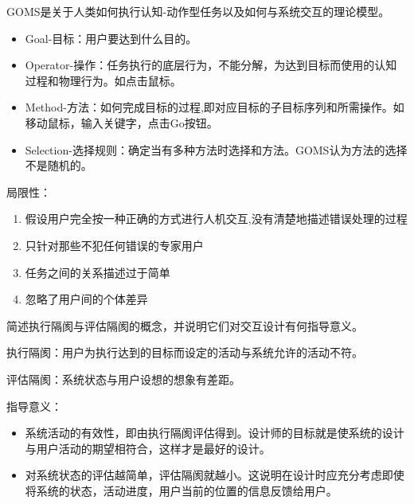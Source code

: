 \begin{solution}
GOMS是关于人类如何执行认知-动作型任务以及如何与系统交互的理论模型。
\begin{itemize}
    \item Goal-目标：用户要达到什么目的。
    \item Operator-操作：任务执行的底层行为，不能分解，为达到目标而使用的认知过程和物理行为。如点击鼠标。
    \item Method-方法：如何完成目标的过程,即对应目标的子目标序列和所需操作。如移动鼠标，输入关键字，点击Go按钮。
    \item Selection-选择规则：确定当有多种方法时选择和方法。GOMS认为方法的选择不是随机的。
\end{itemize}

局限性：
\vspace{-0.8em}
\begin{multicols}{2}
    \begin{enumerate}[label=\arabic*.]
        \item 假设用户完全按一种正确的方式进行人机交互,没有清楚地描述错误处理的过程
        \item 只针对那些不犯任何错误的专家用户
        \item 任务之间的关系描述过于简单
        \item 忽略了用户间的个体差异
    \end{enumerate}
\end{multicols}
\vspace{-1em}
\end{solution}



\begin{problem}[2013]
简述执行隔阂与评估隔阂的概念，并说明它们对交互设计有何指导意义。
\end{problem}

\begin{solution}
执行隔阂：用户为执行达到的目标而设定的活动与系统允许的活动不符。

评估隔阂：系统状态与用户设想的想象有差距。

指导意义：
\begin{itemize}
    \item 系统活动的有效性，即由执行隔阂评估得到。设计师的目标就是使系统的设计与用户活动的期望相符合，这样才是最好的设计。
    \item 对系统状态的评估越简单，评估隔阂就越小。这说明在设计时应充分考虑即使将系统的状态，活动进度，用户当前的位置的信息反馈给用户。
\end{itemize}
\end{solution}




